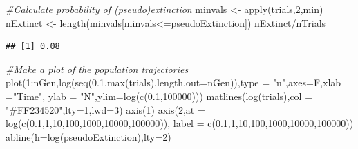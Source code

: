 \documentclass[
  a4paper]{book}
\newenvironment{Shaded}{\begin{snugshade}}{\end{snugshade}}
\newcommand{\AttributeTok}[1]{\textcolor[rgb]{0.77,0.63,0.00}{#1}}
\newcommand{\CommentTok}[1]{\textcolor[rgb]{0.56,0.35,0.01}{\textit{#1}}}
\newcommand{\DecValTok}[1]{\textcolor[rgb]{0.00,0.00,0.81}{#1}}
\newcommand{\FloatTok}[1]{\textcolor[rgb]{0.00,0.00,0.81}{#1}}
\newcommand{\FunctionTok}[1]{\textcolor[rgb]{0.00,0.00,0.00}{#1}}
\newcommand{\NormalTok}[1]{#1}
\newcommand{\OtherTok}[1]{\textcolor[rgb]{0.56,0.35,0.01}{#1}}
\newcommand{\SpecialCharTok}[1]{\textcolor[rgb]{0.00,0.00,0.00}{#1}}
\newcommand{\StringTok}[1]{\textcolor[rgb]{0.31,0.60,0.02}{#1}}
\begin{document}
\begin{Shaded}
\begin{Highlighting}[]
\CommentTok{\#Calculate probability of (pseudo)extinction}
\NormalTok{minvals }\OtherTok{\textless{}{-}} \FunctionTok{apply}\NormalTok{(trials,}\DecValTok{2}\NormalTok{,min)}
\NormalTok{nExtinct }\OtherTok{\textless{}{-}} \FunctionTok{length}\NormalTok{(minvals[minvals}\SpecialCharTok{\textless{}=}\NormalTok{pseudoExtinction])}
\NormalTok{nExtinct}\SpecialCharTok{/}\NormalTok{nTrials}
\end{Highlighting}
\end{Shaded}

\begin{verbatim}
## [1] 0.08
\end{verbatim}

\begin{Shaded}
\begin{Highlighting}[]
\CommentTok{\#Make a plot of the population trajectories}
\FunctionTok{plot}\NormalTok{(}\DecValTok{1}\SpecialCharTok{:}\NormalTok{nGen,}\FunctionTok{log}\NormalTok{(}\FunctionTok{seq}\NormalTok{(}\FloatTok{0.1}\NormalTok{,}\FunctionTok{max}\NormalTok{(trials),}\AttributeTok{length.out=}\NormalTok{nGen)),}\AttributeTok{type =} \StringTok{"n"}\NormalTok{,}\AttributeTok{axes=}\NormalTok{F,}\AttributeTok{xlab =}\StringTok{"Time"}\NormalTok{, }\AttributeTok{ylab =} \StringTok{"N"}\NormalTok{,}\AttributeTok{ylim=}\FunctionTok{log}\NormalTok{(}\FunctionTok{c}\NormalTok{(}\FloatTok{0.1}\NormalTok{,}\DecValTok{100000}\NormalTok{)))}
\FunctionTok{matlines}\NormalTok{(}\FunctionTok{log}\NormalTok{(trials),}\AttributeTok{col =} \StringTok{"\#FF234520"}\NormalTok{,}\AttributeTok{lty=}\DecValTok{1}\NormalTok{,}\AttributeTok{lwd=}\DecValTok{3}\NormalTok{)}
\FunctionTok{axis}\NormalTok{(}\DecValTok{1}\NormalTok{)}
\FunctionTok{axis}\NormalTok{(}\DecValTok{2}\NormalTok{,}\AttributeTok{at =} \FunctionTok{log}\NormalTok{(}\FunctionTok{c}\NormalTok{(}\FloatTok{0.1}\NormalTok{,}\DecValTok{1}\NormalTok{,}\DecValTok{10}\NormalTok{,}\DecValTok{100}\NormalTok{,}\DecValTok{1000}\NormalTok{,}\DecValTok{10000}\NormalTok{,}\DecValTok{100000}\NormalTok{)),}
     \AttributeTok{label =} \FunctionTok{c}\NormalTok{(}\FloatTok{0.1}\NormalTok{,}\DecValTok{1}\NormalTok{,}\DecValTok{10}\NormalTok{,}\DecValTok{100}\NormalTok{,}\DecValTok{1000}\NormalTok{,}\DecValTok{10000}\NormalTok{,}\DecValTok{100000}\NormalTok{))}
\FunctionTok{abline}\NormalTok{(}\AttributeTok{h=}\FunctionTok{log}\NormalTok{(pseudoExtinction),}\AttributeTok{lty=}\DecValTok{2}\NormalTok{)}
\end{Highlighting}
\end{Shaded}
\end{document}
